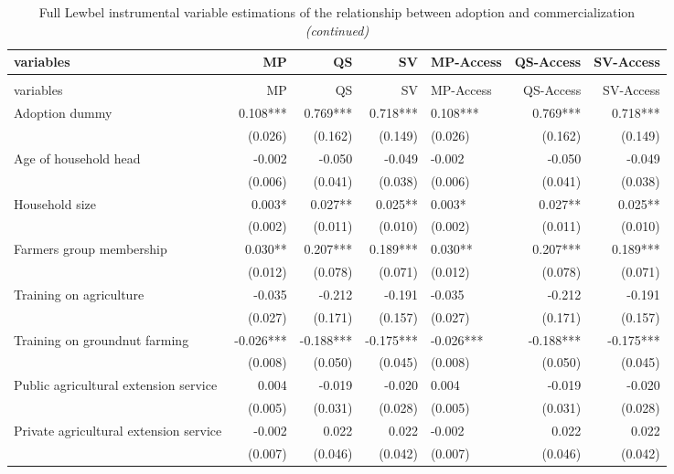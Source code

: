 \documentclass[
]{article}
\begin{document}
\begin{longtable}[t]{lrrrlrr}
\caption{\label{tab:unnamed-chunk-19}Full Lewbel instrumental variable estimations of the relationship between adoption and commercialization}\\
\toprule
variables & MP & QS & SV & MP-Access & QS-Access & SV-Access\\
\midrule
\endfirsthead
\caption[]{\label{tab:unnamed-chunk-19}Full Lewbel instrumental variable estimations of the relationship between adoption and commercialization \textit{(continued)}}\\
\toprule
variables & MP & QS & SV & MP-Access & QS-Access & SV-Access\\
\midrule
\endhead

\endfoot
\bottomrule
\endlastfoot
Adoption dummy & 0.108*** & 0.769*** & 0.718*** & 0.108*** & 0.769*** & 0.718***\\
 & (0.026) & (0.162) & (0.149) & (0.026) & (0.162) & (0.149)\\
Age of household head & -0.002 & -0.050 & -0.049 & -0.002 & -0.050 & -0.049\\
 & (0.006) & (0.041) & (0.038) & (0.006) & (0.041) & (0.038)\\
Household size & 0.003* & 0.027** & 0.025** & 0.003* & 0.027** & 0.025**\\
 & (0.002) & (0.011) & (0.010) & (0.002) & (0.011) & (0.010)\\
Farmers group membership & 0.030** & 0.207*** & 0.189*** & 0.030** & 0.207*** & 0.189***\\
 & (0.012) & (0.078) & (0.071) & (0.012) & (0.078) & (0.071)\\
Training on agriculture & -0.035 & -0.212 & -0.191 & -0.035 & -0.212 & -0.191\\
 & (0.027) & (0.171) & (0.157) & (0.027) & (0.171) & (0.157)\\
Training on groundnut farming & -0.026*** & -0.188*** & -0.175*** & -0.026*** & -0.188*** & -0.175***\\
 & (0.008) & (0.050) & (0.045) & (0.008) & (0.050) & (0.045)\\
Public agricultural extension service & 0.004 & -0.019 & -0.020 & 0.004 & -0.019 & -0.020\\
 & (0.005) & (0.031) & (0.028) & (0.005) & (0.031) & (0.028)\\
Private agricultural extension service & -0.002 & 0.022 & 0.022 & -0.002 & 0.022 & 0.022\\
 & (0.007) & (0.046) & (0.042) & (0.007) & (0.046) & (0.042)\\

\end{longtable}
\end{document}

